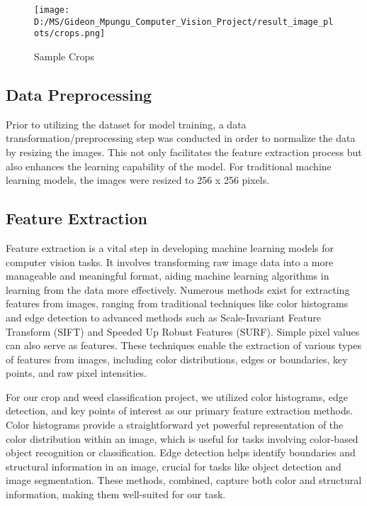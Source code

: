 \documentclass[10pt,twocolumn,letterpaper]{article}
\begin{document}
\begin{figure}[h]
    \texttt{[image: D:/MS/Gideon\_Mpungu\_Computer\_Vision\_Project/result\_image\_plots/crops.png]}
    \caption{Sample Crops}
    \label{fig:crops}
\end{figure}

\subsection{Data Preprocessing}

Prior to utilizing the dataset for model training, a data transformation/preprocessing step was conducted in order to normalize the data by resizing the images. This not only facilitates the feature extraction process but also enhances the learning capability of the model. For traditional machine learning models, the images were resized to 256 x 256 pixels.

\subsection{Feature Extraction}

Feature extraction is a vital step in developing machine learning models for computer vision tasks. It involves transforming raw image data into a more manageable and meaningful format, aiding machine learning algorithms in learning from the data more effectively. Numerous methods exist for extracting features from images, ranging from traditional techniques like color histograms and edge detection to advanced methods such as Scale-Invariant Feature Transform (SIFT) and Speeded Up Robust Features (SURF). Simple pixel values can also serve as features. These techniques enable the extraction of various types of features from images, including color distributions, edges or boundaries, key points, and raw pixel intensities.

For our crop and weed classification project, we utilized color histograms, edge detection, and key points of interest as our primary feature extraction methods. Color histograms provide a straightforward yet powerful representation of the color distribution within an image, which is useful for tasks involving color-based object recognition or classification. Edge detection helps identify boundaries and structural information in an image, crucial for tasks like object detection and image segmentation. These methods, combined, capture both color and structural information, making them well-suited for our task.
\end{document}
